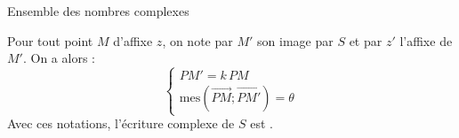 \begin{chapter}{Ensemble des nombres complexes}
\begin{prop}
            Pour tout point $M$ d'affixe $z$, on note par $M'$ son image par $S$ et par $z'$ l'affixe de $M'$.            
            On a alors :
                  \begin{displaymath}
                        \left\lbrace
                              \begin{array}{l}
                                    PM' = k\, PM \\
                                    \mathrm{mes} \left( \overrightarrow{PM} ; \overrightarrow{PM'} \right) = \theta
                              \end{array}
                        \right.
                  \end{displaymath}
            Avec ces notations, l'\'ecriture complexe de $S$ est .
      \end{prop}

\end{chapter}
